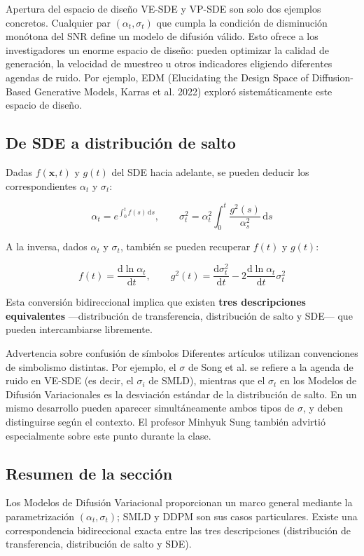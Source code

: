 \begin{knowledgebox}{Apertura del espacio de diseño}
VE-SDE y VP-SDE son solo dos ejemplos concretos. Cualquier par $(\alpha_t, \sigma_t)$ que cumpla la condición de disminución monótona del SNR define un modelo de difusión válido. Esto ofrece a los investigadores un enorme espacio de diseño: pueden optimizar la calidad de generación, la velocidad de muestreo u otros indicadores eligiendo diferentes agendas de ruido. Por ejemplo, EDM (Elucidating the Design Space of Diffusion-Based Generative Models, Karras et al. 2022) exploró sistemáticamente este espacio de diseño.
\end{knowledgebox}

\subsection{De SDE a distribución de salto}

Dadas $f(\mathbf{x}, t)$ y $g(t)$ del SDE hacia adelante, se pueden deducir los correspondientes $\alpha_t$ y $\sigma_t$:

$$
\alpha_t = e^{\int_0^t f(s)\,\mathrm{d}s}, \qquad \sigma_t^2 = \alpha_t^2 \int_0^t \frac{g^2(s)}{\alpha_s^2}\,\mathrm{d}s
$$

A la inversa, dados $\alpha_t$ y $\sigma_t$, también se pueden recuperar $f(t)$ y $g(t)$:

$$
f(t) = \frac{\mathrm{d} \ln \alpha_t}{\mathrm{d}t}, \qquad g^2(t) = \frac{\mathrm{d}\sigma_t^2}{\mathrm{d}t} - 2\frac{\mathrm{d} \ln \alpha_t}{\mathrm{d}t}\sigma_t^2
$$

Esta conversión bidireccional implica que existen \textbf{tres descripciones equivalentes} —distribución de transferencia, distribución de salto y SDE— que pueden intercambiarse libremente.

\begin{warningbox}{Advertencia sobre confusión de símbolos}
Diferentes artículos utilizan convenciones de simbolismo distintas. Por ejemplo, el $\sigma$ de Song et al. se refiere a la agenda de ruido en VE-SDE (es decir, el $\sigma_i$ de SMLD), mientras que el $\sigma_t$ en los Modelos de Difusión Variacionales es la desviación estándar de la distribución de salto. En un mismo desarrollo pueden aparecer simultáneamente ambos tipos de $\sigma$, y deben distinguirse según el contexto. El profesor Minhyuk Sung también advirtió especialmente sobre este punto durante la clase.
\end{warningbox}

\subsection{Resumen de la sección}

Los Modelos de Difusión Variacional proporcionan un marco general mediante la parametrización $(\alpha_t, \sigma_t)$; SMLD y DDPM son sus casos particulares. Existe una correspondencia bidireccional exacta entre las tres descripciones (distribución de transferencia, distribución de salto y SDE).
